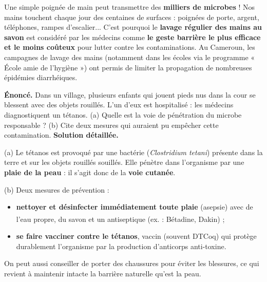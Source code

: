 \documentclass[11pt]{article}
\begin{document}
\begin{savaistu}
Une simple poignée de main peut transmettre des \textbf{milliers de microbes} ! Nos mains touchent chaque jour des centaines de surfaces : poignées de porte, argent, téléphones, rampes d'escalier... C'est pourquoi le \textbf{lavage régulier des mains au savon} est considéré par les médecins comme \textbf{le geste barrière le plus efficace et le moins coûteux} pour lutter contre les contaminations. Au Cameroun, les campagnes de lavage des mains (notamment dans les écoles via le programme « École amie de l'hygiène ») ont permis de limiter la propagation de nombreuses épidémies diarrhéiques.
\end{savaistu}

\begin{exoresolu}
\textbf{Énoncé.} Dans un village, plusieurs enfants qui jouent pieds nus dans la cour se blessent avec des objets rouillés. L'un d'eux est hospitalisé : les médecins diagnostiquent un tétanos. (a) Quelle est la voie de pénétration du microbe responsable ? (b) Cite deux mesures qui auraient pu empêcher cette contamination.
\tcblower
\textbf{Solution détaillée.}

(a) Le tétanos est provoqué par une bactérie (\emph{Clostridium tetani}) présente dans la terre et sur les objets rouillés souillés. Elle pénètre dans l'organisme par une \textbf{plaie de la peau} : il s'agit donc de la \textbf{voie cutanée}.

(b) Deux mesures de prévention :
\begin{itemize}
\item \textbf{nettoyer et désinfecter immédiatement toute plaie} (asepsie) avec de l'eau propre, du savon et un antiseptique (ex. : Bétadine\textsuperscript{\textregistered}, Dakin\textsuperscript{\textregistered}) ;
\item \textbf{se faire vacciner contre le tétanos}, vaccin (souvent DTCoq) qui protège durablement l'organisme par la production d'anticorps anti-toxine.
\end{itemize}
On peut aussi conseiller de porter des chaussures pour éviter les blessures, ce qui revient à maintenir intacte la barrière naturelle qu'est la peau.
\end{exoresolu}
\end{document}
